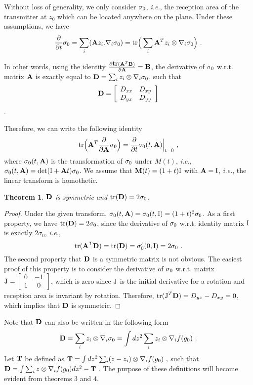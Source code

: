 \documentclass[12pt,english]{article}
\newtheorem{theorem}{Theorem}[section]
\begin{document}
Without loss of generality, we only consider $\ss_0$, {\it i.e.}, the reception area of the transmitter at $z_0$ which can be located anywhere on the plane. Under these assumptions, we have
$$
\frac{\partial}{\partial t}\ss_0=\sum_i (\BA z_i.\nabla_i\ss_0)=\tr\Big(\sum_{i} \BA^Tz_i\otimes \nabla_i\ss_0\Big)~.
$$

In other words, using the identity \mbox{$\frac{\partial \tr(\BA^T\BB)}{\partial \BA}=\BB$}, the derivative of $\ss_0$ w.r.t. matrix $\BA$ is exactly equal to \mbox{$\BD=\sum_{i} z_i\otimes \nabla_i\ss_0$}, 
such that
$$
\BD=\left[
\begin{array}{cc}
D_{xx}&D_{xy}\\
D_{yx}&D_{yy}
\end{array}
\right]
$$. 

Therefore, we can write the following identity
$$
\tr\Big(\BA^T \frac{\partial}{\partial \BA}\ss_0\Big)=\frac{\partial}{\partial t}\ss_0(t,\BA)\Big|_{t=0}~,
$$
where $\ss_0(t,\BA)$ is the transformation of $\ss_0$ under $M(t)$, {\it i.e.}, \mbox{$\ss_0(t,\BA)=\det(\BI+\BA t)\ss_0$}. We assume that {$\BM(t)=(1+t)\BI$} with \mbox{$\BA=\BI$}, {\it i.e.}, the linear transform is homothetic.


\begin{theorem}
$\BD$ is symmetric and $\tr(\BD)=2\ss_0$.
\end{theorem}

\begin{proof}
Under the given transform, $\ss_0(t,\BA)=\ss_0(t,\BI)=(1+t)^2\ss_0$. As a first property, we have \mbox{$\tr(\BD)=2\ss_0$}, since the derivative of $\ss_0$ w.r.t. identity matrix $\BI$ is exactly $2\sigma_0$, {\it i.e.}, 
$$
\tr(\BA^T\BD)=\tr(\BD)=\sigma_0'(0,\BI)=2\ss_0~.$$ 
The second property that $\BD$ is a symmetric matrix is not obvious. The easiest proof of this property is to consider the derivative of $\ss_0$ w.r.t. matrix \mbox{$
\BJ=\left[
\begin{array}{cc}
0&-1\\
1&0
\end{array}
\right]
$},
which is zero since $\BJ$ is the initial derivative for a rotation and reception area is invariant by rotation. 
Therefore, \mbox{$\tr(\BJ^T\BD)=D_{yx}-D_{xy}=0$}, which implies that $\BD$ is symmetric. 
\end{proof}

Note that $\BD$ can also be written in the following form
$$
\BD=\sum\limits_{i}z_i\otimes\nabla_i\ss_0=\int dz^{2}\sum\limits_{i}z_i\otimes\nabla_if(g_0)~.
$$
Let $\BT$ be defined as
$
\BT=\int dz^2\sum_i (z-z_i)\otimes\nabla_i f(g_0)~,
$
such that
$
\BD=\int \sum_{i} z\otimes \nabla_i f(g_0)dz^2 - \BT~.
$
The purpose of these definitions will become evident from theorems $3$ and $4$.
\end{document}
